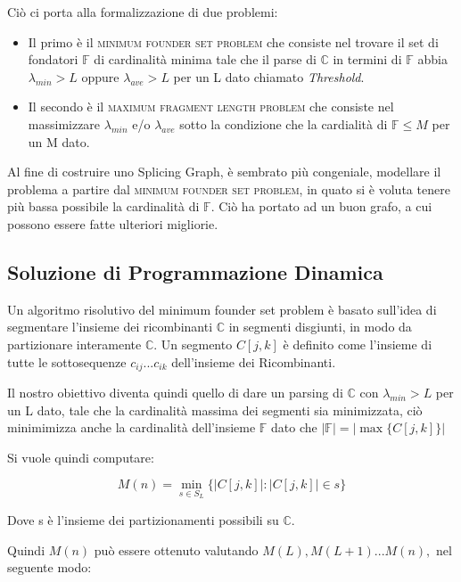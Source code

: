 Ciò ci porta alla formalizzazione di due problemi:

\begin{itemize}
    \item Il primo è il \textsc{minimum founder set problem} che consiste nel trovare il set di fondatori $\mathbb{F}$ di cardinalità minima tale che il parse di $\mathbb{C}$ in termini di $\mathbb{F}$ abbia $\lambda_{min} > L$ oppure $\lambda_{ave} > L$ per un L dato chiamato \textit{Threshold}.
    
    \item Il secondo è il \textsc{maximum fragment length problem} che consiste nel massimizzare $\lambda_{min}$ e/o $\lambda_{ave}$ sotto la condizione che la cardialità di $\mathbb{F} \leq M $ per un M dato.
\end{itemize}

Al fine di costruire uno Splicing Graph, è sembrato più congeniale, modellare il problema a partire dal \textsc{minimum founder set problem}, in quato si è voluta tenere più bassa possibile la cardinalità di $\mathbb{F}$. Ciò ha portato ad un buon grafo, a cui possono essere fatte ulteriori migliorie.

\subsection{Soluzione di Programmazione Dinamica}
Un algoritmo risolutivo del minimum founder set problem è basato sull'idea di segmentare l'insieme dei ricombinanti $\mathbb{C}$ in segmenti disgiunti, in modo da partizionare interamente $\mathbb{C}$. Un segmento $C[j,k]$ è definito come l'insieme di tutte le sottosequenze $c_{ij}...c_{ik}$ dell'insieme dei Ricombinanti. 

Il nostro obiettivo diventa quindi quello di dare un parsing di $\mathbb{C}$ con $\lambda_{min} > L$ per un L dato, tale che la cardinalità massima dei segmenti sia minimizzata, ciò minimimizza anche la cardinalità dell'insieme $\mathbb{F}$ dato che $|\mathbb{F}|=|\max\{C[j,k]\}|$

Si vuole quindi computare:

\begin{equation*}
    M(n)=\min_{s \in S_L}\{|C[j,k]| : |C[j,k]| \in s \} 
\end{equation*}

Dove s è l'insieme dei partizionamenti possibili su $\mathbb{C}$.

Quindi $M(n)$ può essere ottenuto valutando $M(L),M(L+1)...M(n),$ nel seguente modo:

